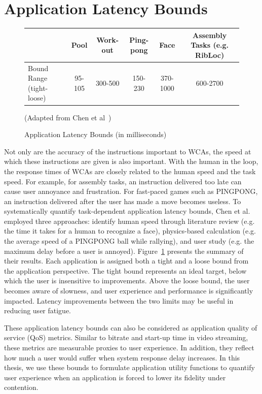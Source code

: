 \section{Application Latency Bounds}

\begin{figure}
\centering
\begin{tabular}{|l|c|c|c|c|c|c|c|}
\hline
                      & Pool & Work-out & Ping-pong & Face &
                      \multicolumn{3}{c|}{Assembly Tasks (e.g. RibLoc)} \\
\hline
\Xhline{2\arrayrulewidth}
\hline
    Bound Range (tight-loose) & 95-105 & 300-500 & 150-230 & 370-1000 & \multicolumn{3}{c|}{600-2700} \\
\hline
\end{tabular}
\caption{Application Latency Bounds (in milliseconds)}
\begin{captiontext}
{\rm (Adapted from Chen et al~\cite{chen2017empirical})}
\end{captiontext}
\label{fig:bg-bounds}
\end{figure}

Not only are the accuracy of the instructions important to WCAs, the speed at
which these instructions are given is also important. With the human in the
loop, the response times of WCAs are closely related to the human speed and the
task speed. For example, for assembly tasks, an instruction delivered too late
can cause user annoyance and frustration. For fast-paced games such as PINGPONG,
an instruction delivered after the user has made a move becomes useless. To
systematically quantify task-dependent application latency bounds, Chen et
al.~\cite{chen2017empirical} employed three approaches: identify human speed
through literature review (e.g. the time it takes for a human to recognize a
face), physics-based calculation (e.g. the average speed of a PINGPONG ball
while rallying), and user study (e.g. the maximum delay before a user is
annoyed). Figure~\ref{fig:bg-bounds} presents the summary of their results. Each
application is assigned both a tight and a loose bound from the application
perspective. The tight bound represents an ideal target, below which the user is
insensitive to improvements. Above the loose bound, the user becomes aware of
slowness, and user experience and performance is significantly impacted. Latency
improvements between the two limits may be useful in reducing user fatigue.

These application latency bounds can also be considered as application quality
of service (QoS) metrics. Similar to bitrate and start-up time in video
streaming, these metrics are measurable proxies to user experience. In addition,
they reflect how much a user would suffer when system response delay increases.
In this thesis, we use these bounds to formulate application utility functions
to quantify user experience when an application is forced to lower its fidelity
under contention.